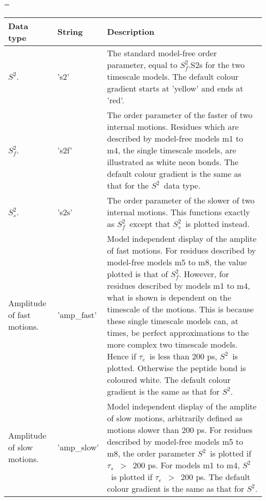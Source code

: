 \documentclass[a4paper,11pt,twoside,openright]{book}
\makeatletter
\let\realnormalsize=\normalsize
\def\liih@math{\ifmmode$\else\bad@math\fi}
\def\adjustnormalsize{\def\normalsize{\mathsurround=0pt \realnormalsize
 \parindent=0pt\abovedisplayskip=0pt\belowdisplayskip=0pt}%
 \def\phantompar{\csname par\endcsname}\normalsize}%
\newcommand\lthtmlvboxmathA{\adjustnormalsize\setbox\sizebox=\vbox\bgroup %
 \let\ifinner=\iffalse \let\)\liih@math }%
\newcommand\lthtmlmathtype[1]{\gdef\lthtmlmathenv{#1}}%
\newcommand\lthtmlfigureA[1]{\let\@savefreelist\@freelist
       \lthtmlmathtype{#1}\lthtmlvboxmathA}%
\makeatother
\begin{document}
{\newpage\clearpage
\lthtmlfigureA{tablestar27593}%
\begin{table*}\begin{scriptsize}
\begin{center}

\begin{tabularx}{\textwidth}{llX}
\\[-5pt]
\toprule
Data type & String & Description \\
\midrule
$S^2$. & 's2' & The standard model-free order parameter, equal to $S^2_f$.S2s for the two timescale models.  The default colour gradient starts at 'yellow' and ends at 'red'. \\
$S^2_f$. & 's2f' & The order parameter of the faster of two internal motions.  Residues which are described by model-free models m1 to m4, the single timescale models, are illustrated as white neon bonds.  The default colour gradient is the same as that for the $S^2$\  data type. \\
$S^2_s$. & 's2s' & The order parameter of the slower of two internal motions.  This functions exactly as $S^2_f$\  except that $S^2_s$\  is plotted instead. \\
Amplitude of fast motions. & 'amp\_fast' & Model independent display of the amplite of fast motions.  For residues described by model-free models m5 to m8, the value plotted is that of $S^2_f$.  However, for residues described by models m1 to m4, what is shown is dependent on the timescale of the motions.  This is because these single timescale models can, at times, be perfect approximations to the more complex two timescale models.  Hence if $\tau_e$\  is less than 200 ps, $S^2$\  is plotted.  Otherwise the peptide bond is coloured white.  The default colour gradient  is the same as that for $S^2$. \\
Amplitude of slow motions. & 'amp\_slow' & Model independent display of the amplite of slow motions, arbitrarily defined as motions slower than 200 ps.  For residues described by model-free models m5 to m8, the order parameter $S^2$\  is plotted if $\tau_s$\  $>$\  200 ps.  For models m1 to m4, $S^2$\  is plotted if $\tau_e$\  $>$\  200 ps.  The default colour gradient is the same as that for $S^2$. \\

\end{tabularx}
\end{center}
\end{scriptsize}
\end{table*}}
\end{document}
